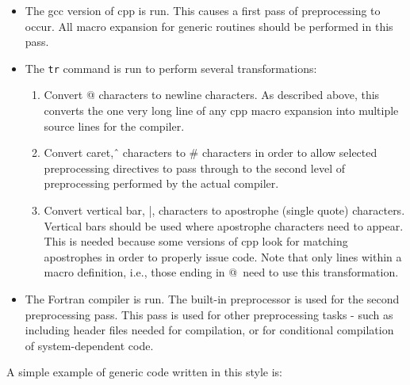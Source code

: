 \begin{itemize}

\item The gcc version of cpp is run.  This causes a first pass of
preprocessing to occur.  All macro expansion for generic routines
should be performed in this pass.

\item The {\tt tr} command is run to perform several transformations:

\begin{enumerate}

\item Convert @ characters to newline characters.  As described above, this
converts the one very long line of any cpp macro expansion into multiple
source lines for the compiler.

\item Convert caret, \^\, characters to \# characters
in order to allow selected preprocessing directives to pass through to the
second level of preprocessing performed by the actual compiler.

\item Convert vertical bar, |, characters to apostrophe (single
quote) characters.  Vertical bars should be used where apostrophe characters
need to appear.  This is needed because some versions of cpp look for matching
apostrophes in order to properly issue code.  Note that only lines within a
macro definition, i.e., those ending in @\, need to use this transformation.

\end{enumerate}

\item The Fortran compiler is run.  The built-in preprocessor is used for
the second preprocessing pass.  This pass is used for other preprocessing
tasks - such as including header files needed for compilation, or for
conditional compilation of system-dependent code.

\end{itemize}

A simple example of generic code written in this style is:

